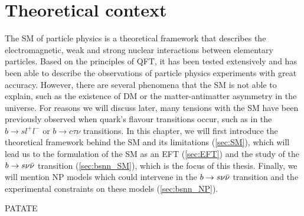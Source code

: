 \chapter{Theoretical context} \label{ch:theory}


The \gls{SM} of particle physics is a theoretical framework that describes the electromagnetic, weak and strong nuclear interactions between elementary particles. 
Based on the principles of \gls{QFT}, it has been tested extensively and has been able to describe the observations of particle physics experiments with great accuracy. 
However, there are several phenomena that the \gls{SM} is not able to explain, such as the existence of \gls{DM} or the matter-antimatter asymmetry in the universe. 
For reasons we will discuss later, many tensions with the \gls{SM} have been previously observed when quark's flavour transitions occur, such as in the $b \to s l^+ l^-$ or $b \to c \tau \nu$ transitions.
In this chapter, we will first introduce the theoretical framework behind the \gls{SM} and its limitations (\ref{sec:SM}), which will lead us to the formulation of the \gls{SM} as an \gls{EFT} (\ref{sec:EFT}) and the study of the $b \to s \nu \Bar{\nu}$ transition (\ref{sec:bsnn_SM}), which is the focus of this thesis.
Finally, we will mention \gls{NP} models which could intervene in the $b \to s \nu \Bar{\nu}$ transition and the experimental constraints on these models (\ref{sec:bsnn_NP}).







PATATE

\cite{kolmogorov}